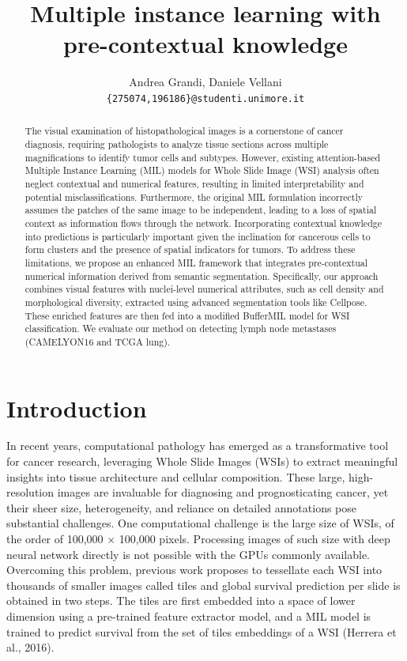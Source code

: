 \documentclass[10pt,twocolumn]{article}
\title{\textbf{Multiple instance learning with pre-contextual knowledge}}
\author{Andrea Grandi, Daniele Vellani \\
\texttt{\{275074,196186\}@studenti.unimore.it}}
\begin{document}
\maketitle

\begin{abstract}
\noindent 
The visual examination of histopathological images is a cornerstone of cancer diagnosis, requiring pathologists to analyze tissue sections across multiple magnifications to identify tumor cells and subtypes. However, existing attention-based Multiple Instance Learning (MIL) models for Whole Slide Image (WSI) analysis often neglect contextual and numerical features, resulting in limited interpretability and potential misclassifications. Furthermore, the original MIL formulation incorrectly assumes the patches of the same image to be independent, leading to a loss of spatial context as information flows through the network. Incorporating contextual knowledge into predictions is particularly important given the inclination for cancerous cells to form clusters and the presence of spatial indicators for tumors. To address these limitations, we propose an enhanced MIL framework that integrates pre-contextual numerical information derived from semantic segmentation. Specifically, our approach combines visual features with nuclei-level numerical attributes, such as cell density and morphological diversity, extracted using advanced segmentation tools like Cellpose. These enriched features are then fed into a modified BufferMIL model for WSI classification. We evaluate our method on detecting lymph node metastases (CAMELYON16 and TCGA lung).

\end{abstract}

\section{Introduction}
In recent years, computational pathology has emerged as a transformative tool for cancer research, leveraging Whole Slide Images (WSIs) to extract meaningful insights into tissue architecture and cellular composition. These large, high-resolution images are invaluable for diagnosing and prognosticating cancer, yet their sheer size, heterogeneity, and reliance on detailed annotations pose substantial challenges. One computational challenge is the large size of WSIs, of the order of 100,000 $\times$ 100,000 pixels. Processing images of such size with deep neural network directly is not possible with the GPUs commonly available. Overcoming this problem, previous work proposes to tessellate each WSI into thousands of smaller images called tiles and global survival prediction per slide is obtained in two steps. The tiles are first embedded into a space of lower dimension using a pre-trained feature extractor model, and a MIL model is trained to predict survival from the set of tiles embeddings of a WSI (Herrera et al., 2016)\cite{8507932}. 
\end{document}
